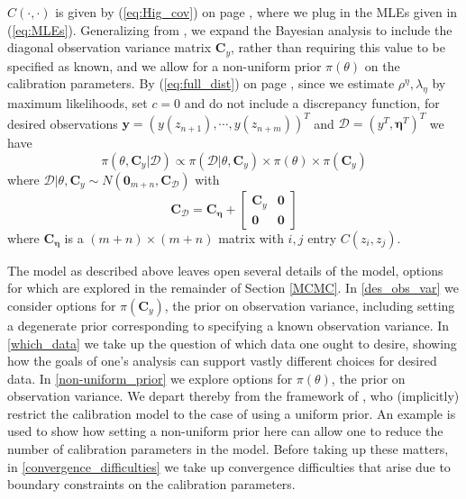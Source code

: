 \documentclass{article}
\begin{document}
$C(\cdot,\cdot)$ is given by (\ref{eq:Hig_cov}) on page \pageref{eq:Hig_cov}, where we plug in the MLEs given in (\ref{eq:MLEs}). Generalizing from \cite{Kennedy2006}, we expand the Bayesian analysis to include the diagonal observation variance matrix $\mathbf C_y$, rather than requiring this value to be specified as known, and we allow for a non-uniform prior $\pi(\theta)$ on the calibration parameters. By (\ref{eq:full_dist}) on page \pageref{eq:full_dist}, 
since we estimate $\rho^\eta,\lambda_\eta$ by maximum likelihoods, set $c=0$ and do not include a discrepancy function, for desired observations $\mathbf y=(y (z_{n+1}),\cdots,y(z_{n+m}))^T$ and $\mathcal D=(y^T, \boldsymbol\eta^T)^T$ we have
\begin{equation}\label{eq:the_model}
\pi(\theta,\mathbf C_y|\mathcal D) \propto \pi (\mathcal D|\theta,\mathbf C_y)\times \pi(\theta)\times \pi(\mathbf C_y)
\end{equation}
where $\mathcal D|\theta,\mathbf C_y \sim N(\boldsymbol 0_{m+n}, \mathbf C_{\mathcal D})$ with 
\begin{equation}\label{eq:the_covariance}
\mathbf C_{\mathcal D} = \mathbf C_{\boldsymbol\eta} + 
\begin{bmatrix}
\mathbf C_y & \boldsymbol 0\\ 
\boldsymbol 0 & \boldsymbol 0
\end{bmatrix}
\end{equation}
where $\mathbf C_{\boldsymbol\eta}$ is a $(m+n)\times(m+n)$ matrix with $i,j$ entry $C(z_i,z_j)$.

The model as described above leaves open several details of the model, options for which are explored in the remainder of Section \ref{MCMC}. In \ref{des_obs_var} we consider options for $\pi(\mathbf C_y)$, the prior on observation variance, including setting a degenerate prior corresponding to specifying a known observation variance. In \ref{which_data} we take up the question of which data one ought to desire, showing how the goals of one's analysis can support vastly different choices for desired data. In \ref{non-uniform_prior} we explore options for $\pi(\theta)$, the prior on observation variance. We depart thereby from the framework of \cite{Kennedy2006}, who (implicitly) restrict the calibration model to the case of using a uniform prior. An example is used to show how setting a non-uniform prior here can allow one to reduce the number of calibration parameters in the model. Before taking up these matters, in \ref{convergence_difficulties} we take up convergence difficulties that arise due to boundary constraints on the calibration parameters.
\end{document}

